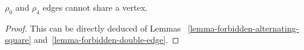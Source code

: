 \begin{corollary}
  \label{0-4-no-share}
  $\rho_0$ and $\rho_4$ edges cannot share a vertex.
\end{corollary}

\begin{proof}
  This can be directly deduced of Lemmas ~\ref{lemma-forbidden-alternating-square} and~\ref{lemma-forbidden-double-edge}.
\end{proof}
